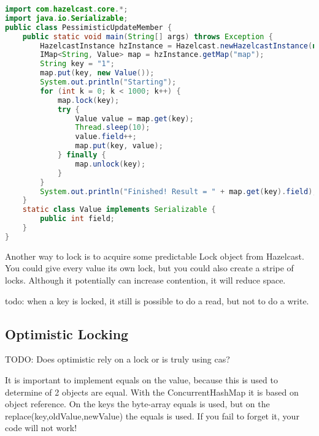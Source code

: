 \begin{lstlisting}[language=java]
import com.hazelcast.core.*;
import java.io.Serializable;
public class PessimisticUpdateMember {
    public static void main(String[] args) throws Exception {
        HazelcastInstance hzInstance = Hazelcast.newHazelcastInstance(null);
        IMap<String, Value> map = hzInstance.getMap("map");
        String key = "1";
        map.put(key, new Value());
        System.out.println("Starting");
        for (int k = 0; k < 1000; k++) {
            map.lock(key);
            try {
                Value value = map.get(key);
                Thread.sleep(10);
                value.field++;
                map.put(key, value);
            } finally {
                map.unlock(key);
            }
        }
        System.out.println("Finished! Result = " + map.get(key).field);
    }
    static class Value implements Serializable {
        public int field;
    }
}
\end{lstlisting}
Another way to lock is to acquire some predictable Lock object from Hazelcast. You could give every value its own lock, but you could also create a stripe of locks. Although it potentially can increase contention, it will reduce space.

todo: when a key is locked, it still is possible to do a read, but not to do a write.

\subsection{Optimistic Locking}
TODO: Does optimistic rely on a lock or is truly using cas?

It is important to implement equals on the value, because this is used to determine of 2 objects are equal. With the ConcurrentHashMap it is based on object reference. On the keys the byte-array equals is used, but on the replace(key,oldValue,newValue) the equals is used. If you fail to forget it, your code will not work!

